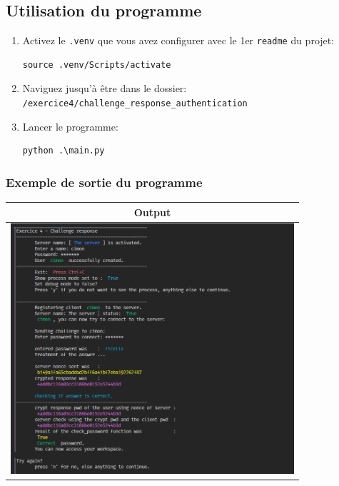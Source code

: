 \documentclass[
  french,
  paper=a4,
  ,captions=tableheading
]{scrartcl}
\begin{document}
\hypertarget{utilisation-du-programme}{%
\subsection{Utilisation du programme}\label{utilisation-du-programme}}

\begin{enumerate}
\def\labelenumi{\arabic{enumi}.}
\item
  Activez le \texttt{.venv} que vous avez configurer avec le 1er
  \texttt{readme} du projet:
\begin{verbatim}
source .venv/Scripts/activate
\end{verbatim}
\item
  Naviguez jusqu'à être dans le dossier:
  \texttt{/exercice4/challenge\_response\_authentication}
\item
  Lancer le programme:
\begin{verbatim}
python .\main.py
\end{verbatim}
\end{enumerate}

\hypertarget{exemple-de-sortie-du-programme}{%
\subsubsection{Exemple de sortie du
programme}\label{exemple-de-sortie-du-programme}}

\begin{longtable}[]{@{}c@{}}
\toprule
Output\tabularnewline
\midrule
\endhead
\includegraphics[width=105mm]{images/i1.png}\tabularnewline
\bottomrule
\end{longtable}
\end{document}
